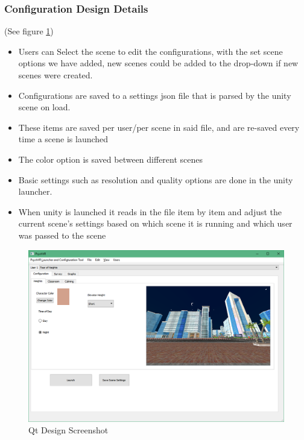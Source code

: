 \documentclass[a4paper,10pt]{article}
\begin{document}
\subsubsection {Configuration Design Details}
(See figure \ref{fig:qtMockupMap})
\begin{itemize}
\item Users can Select the scene to edit the configurations, with the set scene options we have added, new scenes could be added to the drop-down if new scenes were created.
\item Configurations are saved to a settings json file that is parsed by the unity scene on load.
\item These items are saved per user/per scene in said file, and are re-saved every time a scene is launched
\item The color option is saved between different scenes
\item Basic settings such as resolution and quality options are done in the unity launcher.
\item When unity is launched it reads in the file item by item and adjust the current scene's settings based on which scene it is running and which user was passed to the scene

\end{itemize}
\begin{figure}[H]
	\centerline{\includegraphics[scale = 0.5]{qtHeightSettings.png}}
	\caption{Qt Design Screenshot}
	\label{fig:qtMockupMap}
\end{figure}
\pagebreak
\end{document}
